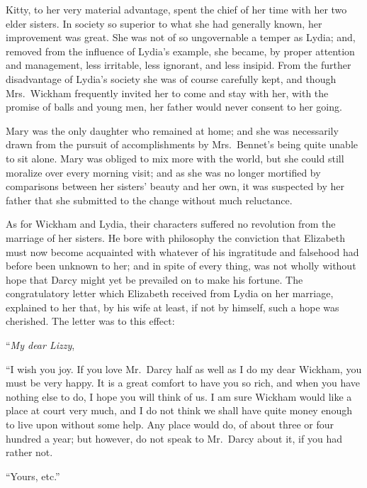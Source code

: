Kitty, to her very material advantage, spent the chief of her
time with her two elder sisters.  In society so superior to
what she had generally known, her improvement was great.  She
was not of so ungovernable a temper as Lydia; and, removed from
the influence of Lydia's example, she became, by proper
attention and management, less irritable, less ignorant, and
less insipid.  From the further disadvantage of Lydia's society
she was of course carefully kept, and though Mrs.\ Wickham
frequently invited her to come and stay with her, with the
promise of balls and young men, her father would never consent
to her going.

Mary was the only daughter who remained at home; and she was
necessarily drawn from the pursuit of accomplishments by
Mrs.\ Bennet's being quite unable to sit alone.  Mary was
obliged to mix more with the world, but she could still
moralize over every morning visit; and as she was no longer
mortified by comparisons between her sisters' beauty and her
own, it was suspected by her father that she submitted to
the change without much reluctance.

As for Wickham and Lydia, their characters suffered no
revolution from the marriage of her sisters.  He bore with
philosophy the conviction that Elizabeth must now become
acquainted with whatever of his ingratitude and falsehood
had before been unknown to her; and in spite of every thing,
was not wholly without hope that Darcy might yet be prevailed
on to make his fortune.  The congratulatory letter which
Elizabeth received from Lydia on her marriage, explained to
her that, by his wife at least, if not by himself, such a
hope was cherished.  The letter was to this effect:

\bigskip
``\emph{My dear Lizzy},
\medskip

``I wish you joy.  If you love Mr.\ Darcy half as well as I do my
dear Wickham, you must be very happy.  It is a great comfort to
have you so rich, and when you have nothing else to do, I hope
you will think of us.  I am sure Wickham would like a place at
court very much, and I do not think we shall have quite money
enough to live upon without some help.  Any place would do, of
about three or four hundred a year; but however, do not speak
to Mr.\ Darcy about it, if you had rather not.

\medskip
``Yours, etc.''
\bigskip


